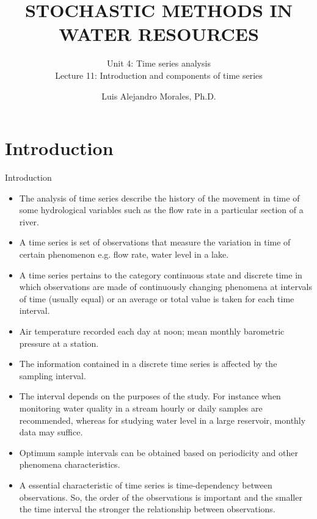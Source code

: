 \documentclass[8pt]{beamer}
\title{STOCHASTIC METHODS IN WATER RESOURCES}
\subtitle{Unit 4: Time series analysis \\ Lecture 11: Introduction and components of time series}
\author{Luis Alejandro Morales, Ph.D.}
\institute{Universidad Nacional de Colombia \\ Department of Civil and Agriculture Engineering} %
\renewcommand{\emph}[1]{\textcolor{myorange}{#1}}
\begin{document}
\begin{frame}
    \titlepage
\end{frame}

\section{Introduction}
\begin{frame}{Introduction}
    \begin{itemize}
        \item The \alert{analysis of time series} describe the \emph{history of the movement in time} of some hydrological variables such as the flow rate in a particular section of a river.
        \item A \alert{time series} is set of observations that measure the \emph{variation in time} of certain phenomenon e.g. flow rate, water level in a lake. 
        \item A \emph{time series} pertains to the category \emph{continuous state} and \emph{discrete time} in which observations are made of continuously changing phenomena at \emph{intervals of time } (usually equal) or an \emph{average } or \emph{total} value is taken for each time interval.
        \item \emph{Air temperature} recorded each day at noon; mean monthly \emph{barometric pressure} at a station. 
        \item The information contained in a \emph{discrete time series} is affected by the \emph{sampling interval}. 
        \item The interval depends on the purposes of the study. For instance when monitoring \emph{water quality} in a stream hourly or daily samples are recommended, whereas for studying \emph{water level} in a large reservoir, monthly data may suffice. 
        \item Optimum sample intervals can be obtained based on \emph{periodicity} and other  phenomena characteristics. 
        \item A essential characteristic of \emph{time series} is \emph{time-dependency} between observations.  So, the order of the observations is important and the smaller the time interval the stronger the relationship between observations. 
    \end{itemize}
\end{frame}
\end{document}
